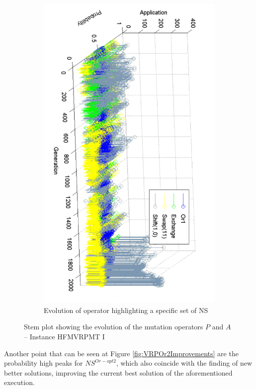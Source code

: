 \documentclass{endm}
\begin{document}
\begin{figure}[t!]
\begin{subfigure}[b]{0.49\textwidth}
        \centering
        \includegraphics[angle=90,width=\textwidth]{./figs/HFVRP/VRPSwapShiftORExchange.pdf}
        \caption{Evolution of operator highlighting a specific set of NS \label{fig:VRPSwapShiftORExchange}}
    \end{subfigure}

    \caption{Stem plot showing the evolution of the mutation operators $P$ and $A$ -- Instance HFMVRPMT I}
\end{figure}


Another point that can be seen at Figure \ref{fig:VRPOr2Improvements} are the probability high peaks for $NS^{Or-opt2}$, which also coincide with the finding of new better solutions, improving the current best solution of the aforementioned execution.
\end{document}
